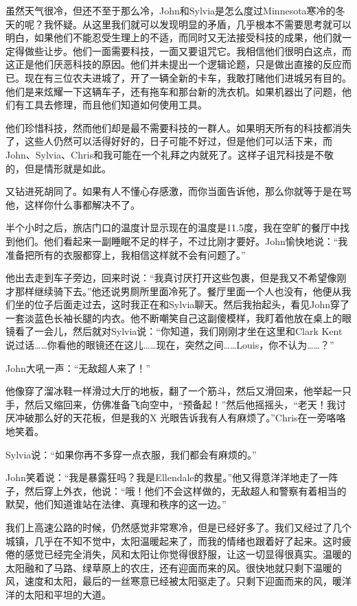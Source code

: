 \documentclass[UTF8]{article}
\begin{document}
\par 虽然天气很冷，但还不至于那么冷，John和Sylvia是怎么度过Minnesota寒冷的冬天的呢？我怀疑。从这里我们就可以发现明显的矛盾，几乎根本不需要思考就可以明白，如果他们不能忍受生理上的不适，而同时又无法接受科技的成果，他们就一定得做些让步。他们一面需要科技，一面又要诅咒它。我相信他们很明白这点，而这正是他们厌恶科技的原因。他们并未提出一个逻辑论题，只是做出直接的反应而已。现在有三位农夫进城了，开了一辆全新的卡车，我敢打赌他们进城另有目的。他们是来炫耀一下这辆车子，还有拖车和那台新的洗衣机。如果机器出了问题，他们有工具去修理，而且他们知道如何使用工具。
\par 他们珍惜科技，然而他们却是最不需要科技的一群人。如果明天所有的科技都消失了，这些人仍然可以活得好好的，日子可能不好过，但是他们可以活下来，而John、Sylvia、Chris和我可能在一个礼拜之内就死了。这样子诅咒科技是不敬的，但是情形就是如此。
\par 又钻进死胡同了。如果有人不懂心存感激，而你当面告诉他，那么你就等于是在骂他，这样你什么事都解决不了。
\par 半个小时之后，旅店门口的温度计显示现在的温度是11.5度，我在空旷的餐厅中找到他们。他们看起来一副睡眠不足的样子，不过比刚才要好。John愉快地说：“我准备把所有的衣服都穿上，我相信这样就不会有问题了。”
\par 他出去走到车子旁边，回来时说：“我真讨厌打开这些包裹，但是我又不希望像刚才那样继续骑下去。”他还说男厕所里面冷死了。餐厅里面一个人也没有，他便从我们坐的位子后面走过去，这时我正在和Sylvia聊天。然后我抬起头，看见John穿了一套淡蓝色长袖长腿的内衣。他不断嘲笑自己这副傻模样，我盯着他放在桌上的眼镜看了一会儿，然后就对Sylvia说：“你知道，我们刚刚才坐在这里和Clark Kent说过话……你看他的眼镜还在这儿……现在，突然之间……Louis，你不认为……？”
\par John大吼一声：“无敌超人来了！”
\par 他像穿了溜冰鞋一样滑过大厅的地板，翻了一个筋斗，然后又滑回来，他举起一只手，然后又缩回来，仿佛准备飞向空中，“预备起！”然后他摇摇头，“老天！我讨厌冲破那么好的天花板，但是我的X 光眼告诉我有人有麻烦了。”Chris在一旁咯咯地笑着。
\par Sylvia说：“如果你再不多穿一点衣服，我们都会有麻烦的。”
\par John笑着说：“我是暴露狂吗？我是Ellendale的救星。”他又得意洋洋地走了一阵子，然后穿上外衣，他说：“哦！他们不会这样做的，无敌超人和警察有着相当的默契，他们知道谁站在法律、真理和秩序的这一边。”
\par 我们上高速公路的时候，仍然感觉非常寒冷，但是已经好多了。我们又经过了几个城镇，几乎在不知不觉中，太阳温暖起来了，而我的情绪也跟着好了起来。这时疲倦的感觉已经完全消失，风和太阳让你觉得很舒服，让这一切显得很真实。温暖的太阳融和了马路、绿草原上的农庄，还有迎面而来的风。很快地就只剩下温暖的风，速度和太阳，最后的一丝寒意已经被太阳驱走了。只剩下迎面而来的风，暖洋洋的太阳和平坦的大道。
\end{document}
